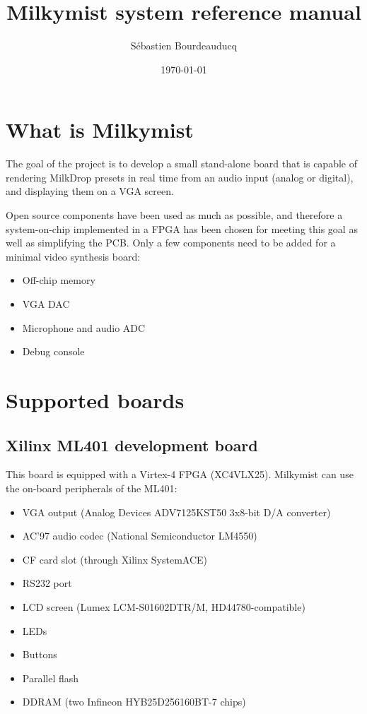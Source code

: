 \documentclass[a4paper,11pt]{article}
\title{Milkymist system reference manual}
\author{S\'ebastien Bourdeauducq}
\date{\today}
\begin{document}
\maketitle{}
\section{What is Milkymist}
The goal of the project is to develop a small stand-alone board that is capable of rendering MilkDrop presets in real time from an audio input (analog or digital), and displaying them on a VGA screen.

Open source components have been used as much as possible, and therefore a system-on-chip implemented in a FPGA has been chosen for meeting this goal as well as simplifying the PCB. Only a few components need to be added for a minimal video synthesis board:
\begin{itemize}
\item Off-chip memory
\item VGA DAC
\item Microphone and audio ADC
\item Debug console
\end{itemize}

\section{Supported boards}
\subsection{Xilinx ML401 development board}
This board is equipped with a Virtex-4 FPGA (XC4VLX25). Milkymist can use the on-board peripherals of the ML401:
\begin{itemize}
\item VGA output (Analog Devices ADV7125KST50 3x8-bit D/A converter)
\item AC'97 audio codec (National Semiconductor LM4550)
\item CF card slot (through Xilinx SystemACE)
\item RS232 port
\item LCD screen (Lumex LCM-S01602DTR/M, HD44780-compatible)
\item LEDs
\item Buttons
\item Parallel flash
\item DDRAM (two Infineon HYB25D256160BT-7 chips)
\end{itemize}
\end{document}
